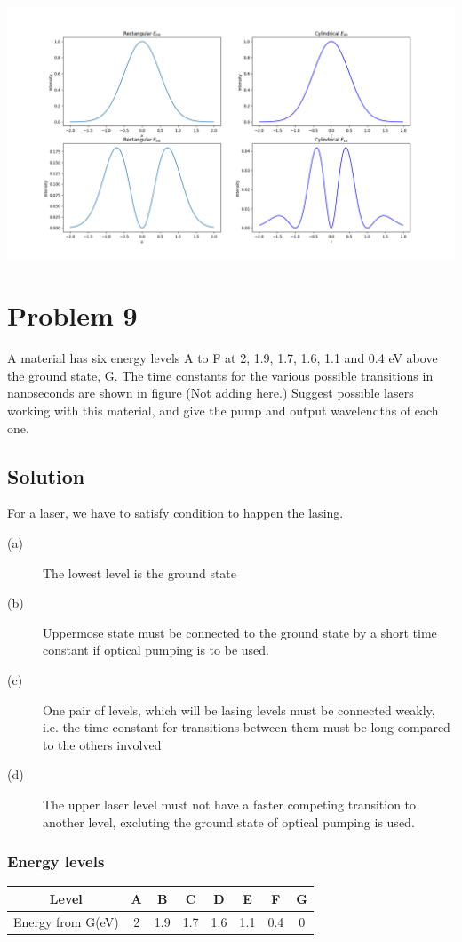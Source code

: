 \documentclass[a4paper,11pt]{article}
\begin{document}
\begin{center}
\includegraphics[width=.9\linewidth]{laser_intensity.png}
\end{center}



\section*{Problem 9}
\label{sec:org78f6974}
A material has six energy levels A to F at 2, 1.9, 1.7, 1.6, 1.1 and 0.4 eV above the ground state, G. The time constants for the various possible transitions in nanoseconds are shown in figure (Not adding here.) Suggest possible lasers working with this material, and give the pump and output wavelendths of each one.
\subsection*{Solution}
\label{sec:orgbde81c1}

For a laser, we have to satisfy condition to happen the lasing.
\begin{description}
\item[{(a)}] The lowest level is the ground state
\item[{(b)}] Uppermose state must be connected to the ground state by a short time constant if optical pumping is to be used.
\item[{(c)}] One pair of levels, which will be lasing levels must be connected weakly, i.e. the time constant for transitions between them must be long compared to the others involved
\item[{(d)}] The upper laser level must not have a faster competing transition to another level, excluting the ground state of optical pumping is used.
\end{description}

\subsubsection*{Energy levels}
\label{sec:org05acb91}
\begin{center}
\begin{tabular}{|c|c|c|c|c|c|c|c|}
\hline
Level & A & B & C & D & E & F & G\\
\hline
Energy from G(eV) & 2 & 1.9 & 1.7 & 1.6 & 1.1 & 0.4 & 0\\
\hline
\end{tabular}
\end{center}
\end{document}
